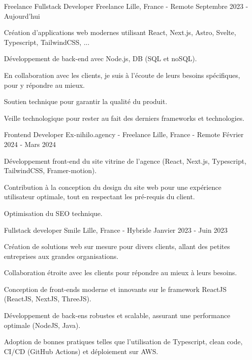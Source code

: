 
\begin{cventries}  \cventry
    {Freelance Fullstack Developer} %
    {Freelance} %
    {Lille, France - Remote} %
    {Septembre 2023 - Aujourd'hui} %
    {
      \begin{cvitems} %
        \item {Création d'applications web modernes utilisant React, Next.js, Astro, Svelte, Typescript, TailwindCSS, ...}
        \item {Développement de back-end avec Node.js, DB (SQL et noSQL).}
        \item {En collaboration avec les clients, je suis à l'écoute de leurs besoins spécifiques, pour y répondre au mieux.}
        \item {Soutien technique pour garantir la qualité du produit.}
        \item {Veille technologique pour rester au fait des derniers frameworks et technologies.}
      \end{cvitems}
    }

  \cventry
    {Frontend Developer} %
    {Ex-nihilo.agency - Freelance} %
    {Lille, France - Remote} %
    {Février 2024 - Mars 2024} %
    {
      \begin{cvitems} %
        \item {Développement front-end du site vitrine de l'agence (React, Next.js, Typescript, TailwindCSS, Framer-motion).}
        \item {Contribution à la conception du design du site web pour une expérience utilisateur optimale, tout en respectant les pré-requis du client.}
        \item {Optimisation du SEO technique.}
      \end{cvitems}
    }

  \cventry
    {Fullstack developer} %
    {Smile} %
    {Lille, France - Hybride} %
    {Janvier 2023 - Juin 2023} %
    {
      \begin{cvitems} %
        \item {Création de solutions web sur mesure pour divers clients, allant des petites entreprises aux grandes organisations.}
        \item {Collaboration étroite avec les clients pour répondre au mieux à leurs besoins.}
        \item {Conception de front-ends moderne et innovants sur le framework ReactJS (ReactJS, NextJS, ThreeJS).}
        \item {Développement de back-ens robustes et scalable, assurant une performance optimale (NodeJS, Java).}
        \item {Adoption de bonnes pratiques telles que l'utilisation de Typescript, clean code, CI/CD (GitHub Actions) et déploiement sur AWS.}
      \end{cvitems}
    }


\end{cventries}
